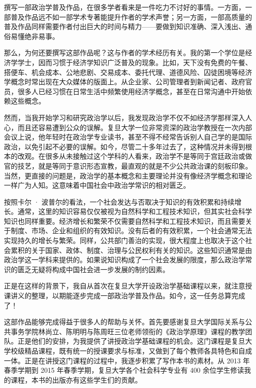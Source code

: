 
撰写一部政治学普及作品，在很多学者看来是一件吃力不讨好的事情。一方面，一部普及作品远不如一部学术专著能提升作者的学术声誉；另一方面，一部高质量的普及作品同样需要作者付出巨大的时间与精力——要做到知识准确、深入浅出、通俗易懂绝非易事。

那么，为何还要撰写这部作品呢？这与作者的学术经历有关。我的第一个学位是经济学学士，因而习惯于经济学知识广泛普及的现象。比如，天下没有免费的午餐、搭便车、机会成本、公地悲剧、交易成本、委托代理、道德风险、囚徒困境等经济学概念时常出现在大众媒体的版面上。从企业家、公司管理者到新闻记者、政府官员，很多人已经习惯在日常生活中频繁使用经济学概念，甚至在日常沟通中开始依赖这些概念。

然而，当我开始学习和研究政治学以后，我发现政治学不仅不如经济学那样深入人心，而且还容易遭到公众的误解。复旦大学一位非常资深的政治学教授在一次内部会议上说，他年轻时在政治学专业读书，甚至不得不经常告诉别人自己学的是国际政治，以免引起不必要的误解。如今，尽管二十多年过去了，这种情况并未得到根本的改观。在很多从未接触过这个学科的人看来，政治学不是等同于宫廷政治或做官的技艺，就是等同于意识形态宣教，最直观的就是不少公共政治课的刻板印象。当然，更直接的问题是，政治学的基本概念和主要理论并没有像经济学概念和理论一样广为人知。这意味着中国社会中政治学常识的相对匮乏。

按照卡尔 · 波普尔的看法，一个社会发达与否取决于知识的有效积累和持续增长。通常，这里的知识容易仅仅被视为自然科学和工程技术知识，但其实社会科学知识也同样重要。经济增长和繁荣不仅需要自然科学和工程技术知识，而且需要关于制度、市场、企业和组织的有效知识。没有后者的有效积累，一个社会通常无法实现持久的增长与繁荣。同样，公共部门善治的实现，很大程度上也取决于这个社会累积的关于国家、政体、制度、治理与公民权利有关的知识。这些知识通常是由政治学这一学科来提供的。如果说知识构成了一个社会发展的限度，那么政治学常识的匮乏无疑将构成中国社会进一步发展的制约因素。

正是在这样的背景下，我自从首次在复旦大学开设政治学基础课程以来，就注意授课讲义的整理，以期能逐步完成一部政治学普及作品。如今，这一任务总算完成了！

这部作品能够完成得益于很多人的帮助与关怀。首先要感谢复旦大学国际关系与公共事务学院林尚立、陈明明与陈周旺三位老师领衔的《政治学原理》课程的教学团队。正是他们的安排，为我提供了讲授政治学基础课程的机会。这门课程是复旦大学校级精品课程，既有统一的授课要求与标准，又做到了每个教师各具特色和自成一体。正是在讲授这门课程的过程中，我逐步积累了写作本书的素材。从 2013 年春季学期到 2015 年春季学期，复旦大学各个社会科学专业有 400 余位学生修读我的课程，本书的出版亦有这些学生们的贡献。

